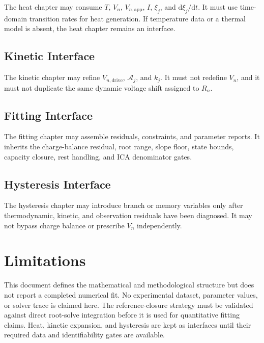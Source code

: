 \documentclass[11pt,a4paper]{article}
\newcommand{\dd}{\mathrm{d}}
\newcommand{\app}{\mathrm{app}}
\newcommand{\drive}{\mathrm{drive}}
\begin{document}
The heat chapter may consume \(T\), \(V_n\), \(V_{n,\app}\), \(I\), \(\xi_j\), and \(\dd \xi_j/\dd t\). It must use time-domain transition rates for heat generation. If temperature data or a thermal model is absent, the heat chapter remains an interface.

\subsection{Kinetic Interface}

The kinetic chapter may refine \(V_{n,\drive}\), \(\mathcal{A}_j\), and \(k_j\). It must not redefine \(V_n\), and it must not duplicate the same dynamic voltage shift assigned to \(R_n\).

\subsection{Fitting Interface}

The fitting chapter may assemble residuals, constraints, and parameter reports. It inherits the charge-balance residual, root range, slope floor, state bounds, capacity closure, rest handling, and ICA denominator gates.

\subsection{Hysteresis Interface}

The hysteresis chapter may introduce branch or memory variables only after thermodynamic, kinetic, and observation residuals have been diagnosed. It may not bypass charge balance or prescribe \(V_n\) independently.

\section{Limitations}

This document defines the mathematical and methodological structure but does not report a completed numerical fit. No experimental dataset, parameter values, or solver trace is claimed here. The reference-closure strategy must be validated against direct root-solve integration before it is used for quantitative fitting claims. Heat, kinetic expansion, and hysteresis are kept as interfaces until their required data and identifiability gates are available.
\end{document}
